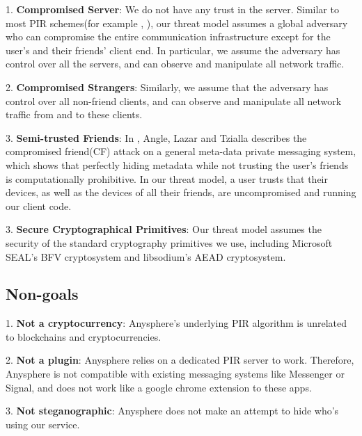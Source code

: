 


1. \textbf{Compromised Server}: We do not have any trust in the server. Similar to most PIR schemes(for example \cite{ahmad2021addra}, ), our threat model assumes a global adversary who can compromise the entire communication infrastructure except for the user's and their friends' client end. In particular, we assume the adversary has control over all the servers, and can observe and manipulate all network traffic.

2. \textbf{Compromised Strangers}: Similarly, we assume that the adversary has control over all non-friend clients, and can observe and manipulate all network traffic from and to these clients.

3. \textbf{Semi-trusted Friends}: In \cite{angel2018s}, Angle, Lazar and Tzialla describes the compromised friend(CF) attack on a general meta-data private messaging system, which shows that perfectly hiding metadata while not trusting the user's friends is computationally prohibitive. In our threat model, a user trusts that their devices, as well as the devices of all their friends, are uncompromised and running our client code.  

3. \textbf{Secure Cryptographical Primitives}: Our threat model assumes the security of the standard cryptography primitives we use, including Microsoft SEAL's BFV cryptosystem and libsodium's AEAD cryptosystem. 



\subsection{Non-goals}
1. \textbf{Not a cryptocurrency}: Anysphere's underlying PIR algorithm is unrelated to blockchains and cryptocurrencies. 

2. \textbf{Not a plugin}: Anysphere relies on a dedicated PIR server to work. Therefore, Anysphere is not compatible with existing messaging systems like Messenger or Signal, and does not work like a google chrome extension to these apps. 

3. \textbf{Not steganographic}: Anysphere does not make an attempt to hide who's using our service. 


